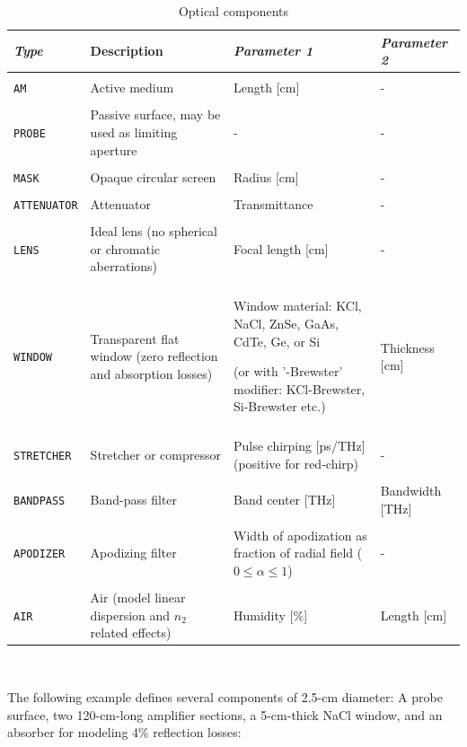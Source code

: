 \documentclass{report}
\begin{document}
\begin{table}
\caption{Optical components}
\label{table:components}
\def\tabularxcolumn#1{m{#1}}
\begin{tabularx}{\textwidth}{|l|X|X|X|}
\hline 
\textit{\textbf{Type}} & Description & \textit{\textbf{Parameter 1}} & \textit{\textbf{Parameter 2}} \\
\hline 
&&&\\
\texttt{AM}	& Active medium	& Length [cm]	& - \\
&&&\\
\texttt{PROBE} & Passive surface, may be used as limiting aperture &	- &	-\\
&&&\\
\texttt{MASK} & Opaque circular screen & Radius [cm] & -\\
&&&\\
\texttt{ATTENUATOR} & Attenuator & Transmittance & -\\
&&&\\
\texttt{LENS} & Ideal lens (no spherical or chromatic aberrations)& Focal length [cm]& -\\
&&&\\
\texttt{WINDOW} & Transparent flat window (zero reflection and absorption losses) & Window material: KCl, NaCl, ZnSe, GaAs, CdTe, Ge, or Si 

(or with '-Brewster' modifier: KCl-Brewster, Si-Brewster etc.) & Thickness [cm]\\
&&&\\
\texttt{STRETCHER} & Stretcher or compressor & Pulse chirping [ps/THz] (positive for red-chirp) & -\\
&&&\\
\texttt{BANDPASS} & Band-pass filter & Band center [THz] & Bandwidth [THz]\\
&&&\\
\texttt{APODIZER} & Apodizing filter & Width of apodization as fraction of radial field (${0\leq\alpha\leq1}$) & -\\
&&&\\
\texttt{AIR} & Air (model linear dispersion and $n_2$ related effects) & Humidity [\%] & Length [cm]\\
\hline
\end{tabularx}\\
\end{table}


The following example defines several components of 2.5-cm diameter: A probe surface, two 120-cm-long amplifier sections, a 5-cm-thick NaCl window, and an absorber for modeling 4\% reflection losses:
\end{document}
